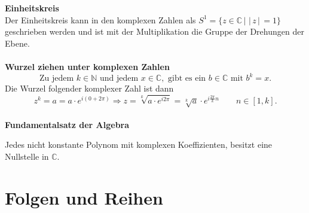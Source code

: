 \documentclass[a4paper,12pt]{article}
\numberwithin{equation}{section}
\begin{document}
\textbf{Einheitskreis}\\
Der Einheitskreis kann in den komplexen Zahlen als $S^{1}=\{z \in \mathbb{C}\,|\, \,|\, z\,|\, =1\}$ geschrieben werden und ist mit der Multiplikation die Gruppe der Drehungen der Ebene.
\\\hfill\\\textbf{Wurzel ziehen unter komplexen Zahlen}
\[ 
\text{Zu jedem }k \in \mathbb{N}\text{ und jedem }x \in \mathbb{C},\text{ gibt es ein }b \in \mathbb{C}\text{ mit }b^{k}=x
.\] 
Die Wurzel folgender komplexer Zahl ist dann
\[ 
        z^k=a=a\cdot e^{i\left(0+2\pi\right)}\Rightarrow z=\sqrt[k]{a\cdot e^{i2\pi}}=\sqrt[k]{a}\cdot e^{i\tfrac{2\pi}{k}n}\qquad n  \in [1,k]
.\] 
\hfill\\\textbf{Fundamentalsatz der Algebra}
\begin{center}
        Jedes nicht konstante Polynom mit komplexen Koeffizienten, besitzt eine Nullstelle in $\mathbb{C}$.
\end{center}

\section{Folgen und Reihen}
\end{document}
